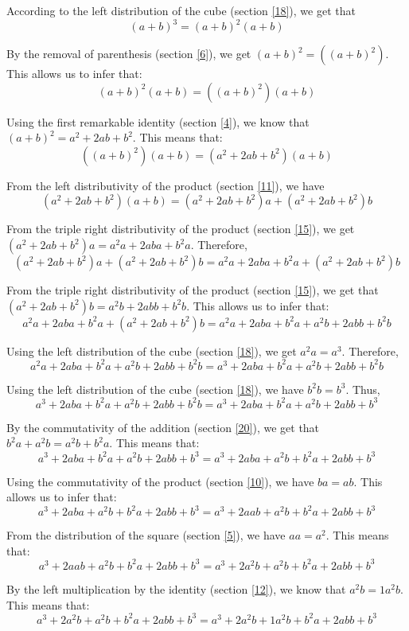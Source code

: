 \documentclass[a4paper]{article}
\begin{document}
According to the left distribution of the cube (section \ref{18}), we get that
\[\left(a+b\right)^3=\left(a+b\right)^2\left(a+b\right)\]

By the removal of parenthesis (section \ref{6}), we get $\left(a+b\right)^2=\left(\left(a+b\right)^2\right)$. This allows us to infer that:
\[\left(a+b\right)^2\left(a+b\right)=\left(\left(a+b\right)^2\right)\left(a+b\right)\]

Using the first remarkable identity (section \ref{4}), we know that $\left(a+b\right)^2=a^2+2ab+b^2$. This means that:
\[\left(\left(a+b\right)^2\right)\left(a+b\right)=\left(a^2+2ab+b^2\right)\left(a+b\right)\]

From the left distributivity of the product (section \ref{11}), we have
\[\left(a^2+2ab+b^2\right)\left(a+b\right)=\left(a^2+2ab+b^2\right)a+\left(a^2+2ab+b^2\right)b\]

From the triple right distributivity of the product (section \ref{15}), we get $\left(a^2+2ab+b^2\right)a=a^2a+2aba+b^2a$. Therefore,
\[\left(a^2+2ab+b^2\right)a+\left(a^2+2ab+b^2\right)b=a^2a+2aba+b^2a+\left(a^2+2ab+b^2\right)b\]

From the triple right distributivity of the product (section \ref{15}), we get that $\left(a^2+2ab+b^2\right)b=a^2b+2abb+b^2b$. This allows us to infer that:
\[a^2a+2aba+b^2a+\left(a^2+2ab+b^2\right)b=a^2a+2aba+b^2a+a^2b+2abb+b^2b\]

Using the left distribution of the cube (section \ref{18}), we get $a^2a=a^3$. Therefore,
\[a^2a+2aba+b^2a+a^2b+2abb+b^2b=a^3+2aba+b^2a+a^2b+2abb+b^2b\]

Using the left distribution of the cube (section \ref{18}), we have $b^2b=b^3$. Thus,
\[a^3+2aba+b^2a+a^2b+2abb+b^2b=a^3+2aba+b^2a+a^2b+2abb+b^3\]

By the commutativity of the addition (section \ref{20}), we get that $b^2a+a^2b=a^2b+b^2a$. This means that:
\[a^3+2aba+b^2a+a^2b+2abb+b^3=a^3+2aba+a^2b+b^2a+2abb+b^3\]

Using the commutativity of the product (section \ref{10}), we have $ba=ab$. This allows us to infer that:
\[a^3+2aba+a^2b+b^2a+2abb+b^3=a^3+2aab+a^2b+b^2a+2abb+b^3\]

From the distribution of the square (section \ref{5}), we have $aa=a^2$. This means that:
\[a^3+2aab+a^2b+b^2a+2abb+b^3=a^3+2a^2b+a^2b+b^2a+2abb+b^3\]

By the left multiplication by the identity (section \ref{12}), we know that $a^2b=1a^2b$. This means that:
\[a^3+2a^2b+a^2b+b^2a+2abb+b^3=a^3+2a^2b+1a^2b+b^2a+2abb+b^3\]
\end{document}

